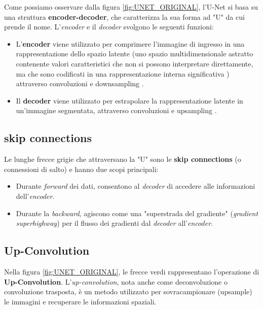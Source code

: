 

Come possiamo osservare dalla figura \ref{fig:UNET_ORIGINAL}, l'U-Net si basa su una 
struttura \textbf{encoder-decoder}, che caratterizza la sua forma ad "U" da cui prende il nome.
L'\textit{encoder} e il \textit{decoder} svolgono le seguenti funzioni:

\begin{itemize}
    \item L'\textbf{encoder} viene utilizzato per comprimere l'immagine di ingresso in 
    una rappresentazione dello spazio latente (uno spazio multidimensionale astratto 
    contenente valori caratteristici che non si possono interpretare direttamente, ma che sono  
    codificati in una rappresentazione interna significativa \cite{SPAZIO_LATENTE})
    attraverso convoluzioni e downsampling \cite{APSETTI_UNET}.

    \item Il \textbf{decoder} viene utilizzato per estrapolare la 
    rappresentazione latente in un'immagine segmentata, 
    attraverso convoluzioni e upsampling \cite{APSETTI_UNET}.
\end{itemize}

\subsection{skip connections}
Le lunghe frecce grigie che attraversano la "U" sono le \textbf{skip connections} (o connessioni di salto) 
e hanno due scopi principali:

\begin{itemize}
    \item Durante \textit{forward} dei dati, consentono al \textit{decoder} di accedere alle 
    informazioni dell'\textit{encoder}.

    \item Durante la \textit{backward}, agiscono come una "superstrada del gradiente" 
    (\textit{gradient superhighway}) per il flusso dei gradienti dal 
    \textit{decoder} all'\textit{encoder}.
\end{itemize}

\subsection{Up-Convolution}
Nella figura \ref{fig:UNET_ORIGINAL}, le frecce verdi rappresentano l'operazione 
di \textbf{Up-Convolution}.
L'\textit{up-convolution}, nota anche come deconvoluzione o convoluzione trasposta, 
è un metodo utilizzato per sovracampionare (upsample) le immagini e recuperare le 
informazioni spaziali.

